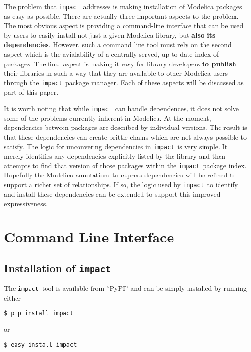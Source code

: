 \documentclass[11pt,a4paper,twocolumn]{article}
\newcommand{\impact}{\texttt{impact}} %
\begin{document}
The problem that \impact\ addresses is making installation of Modelica
packages as easy as possible.  There are actually three important
aspects to the problem.  The most obvious aspect is providing a
command-line interface that can be used by users to easily install not
just a given Modelica library, but \textbf{also its dependencies}.
However, such a command line tool must rely on the second aspect which
is the avialability of a centrally served, up to date index of
packages.  The final aspect is making it easy for library developers
\textbf{to publish} their libraries in such a way that they are
available to other Modelica users through the \impact\ package
manager.  Each of these aspects will be discussed as part of this
paper.

It is worth noting that while \impact\ can handle dependences, it
does not solve some of the problems currently inherent in Modelica.  At
the moment, dependencies between packages are described by individual
versions.  The result is that these dependencies can create brittle
chains which are not always possible to satisfy. The logic for
unconvering dependencies in \impact\ is very simple.  It merely
identifies any dependencies explicitly listed by the library and then
attempts to find that version of those packages within the
\impact\ package index. Hopefully the Modelica annotations to express
dependencies will be refined to support a richer set of relationships.
If so, the logic used by \impact\ to identify and install these
dependencies can be extended to support this improved expressiveness.

\section{Command Line Interface}
\label{sec:command_line}

\subsection{Installation of \impact}
\label{sec:install}

The \impact\ tool is available from ``PyPI''\cite{pypi} and
can be simply installed by running either

\begin{verbatim}
$ pip install impact
\end{verbatim}
or
\begin{verbatim}
$ easy_install impact
\end{verbatim}
\end{document}
